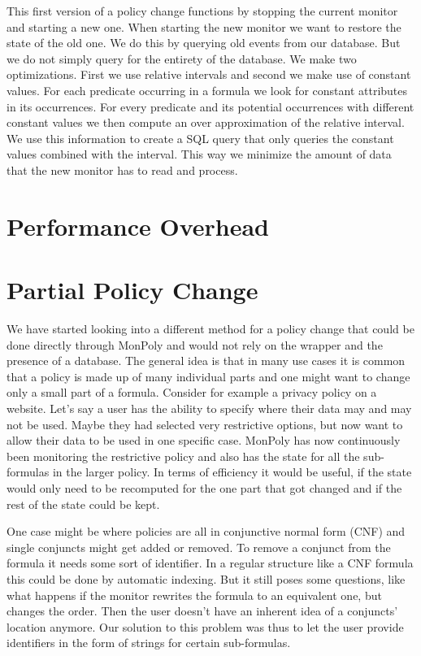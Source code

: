 This first version of a policy change functions by stopping the current monitor and starting a new one.
When starting the new monitor we want to restore the state of the old one.
We do this by querying old events from our database.
But we do not simply query for the entirety of the database.
We make two optimizations.
First we use relative intervals and second we make use of constant values.
For each predicate occurring in a formula we look for constant attributes in its occurrences.
For every predicate and its potential occurrences with different constant values we then compute an over approximation of the relative interval.
We use this information to create a SQL query that only queries the constant values combined with the interval.
This way we minimize the amount of data that the new monitor has to read and process.

\section{Performance Overhead}


\section{Partial Policy Change}

We have started looking into a different method for a policy change that could be done directly through MonPoly and would not rely on the wrapper and the presence of a database.
The general idea is that in many use cases it is common that a policy is made up of many individual parts and one might want to change only a small part of a formula.
Consider for example a privacy policy on a website.
Let's say a user has the ability to specify where their data may and may not be used.
Maybe they had selected very restrictive options, but now want to allow their data to be used in one specific case.
MonPoly has now continuously been monitoring the restrictive policy and also has the state for all the sub-formulas in the larger policy.
In terms of efficiency it would be useful, if the state would only need to be recomputed for the one part that got changed and if the rest of the state could be kept.

One case might be where policies are all in conjunctive normal form (CNF) and single conjuncts might get added or removed.
To remove a conjunct from the formula it needs some sort of identifier.
In a regular structure like a CNF formula this could be done by automatic indexing.
But it still poses some questions, like what happens if the monitor rewrites the formula to an equivalent one, but changes the order.
Then the user doesn't have an inherent idea of a conjuncts' location anymore.
Our solution to this problem was thus to let the user provide identifiers in the form of strings for certain sub-formulas.

